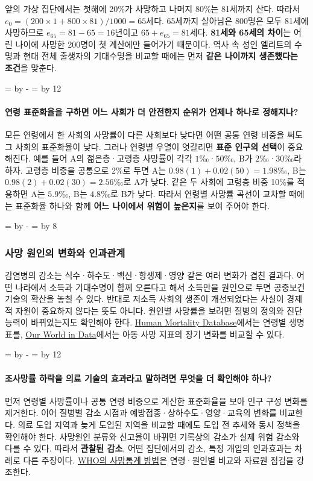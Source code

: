 \documentclass[10pt,a4paper]{article}
\newcommand{\ReserveQuestionSpace}{%
  \par\begingroup
  \dimen0=\pagegoal \advance\dimen0 by -\pagetotal
  \dimen2=\baselineskip \multiply\dimen2 by 12
  \ifdim\dimen0<\dimen2 \newpage\fi
  \endgroup}
\newcommand{\ReserveReadingSectionSpace}{%
  \par\begingroup
  \dimen0=\pagegoal \advance\dimen0 by -\pagetotal
  \dimen2=\baselineskip \multiply\dimen2 by 8
  \ifdim\dimen0<\dimen2 \newpage\fi
  \endgroup}
\begin{document}
앞의 가상 집단에서는 첫해에 20\%가 사망하고 나머지 80\%는 81세까지 산다. 따라서 $e_0=(200\times1+800\times81)/1000=65$세다. 65세까지 살아남은 800명은 모두 81세에 사망하므로 $e_{65}=81-65=16$년이고 $65+e_{65}=81$세다. \textbf{81세와 65세의 차이}는 어린 나이에 사망한 200명이 첫 계산에만 들어가기 때문이다. 역사 속 성인 엘리트의 수명과 현대 전체 출생자의 기대수명을 비교할 때에는 먼저 \textbf{같은 나이까지 생존했다는 조건}을 맞춘다.\par

\ReserveQuestionSpace
\paragraph{연령 표준화율을 구하면 어느 사회가 더 안전한지 순위가 언제나 하나로 정해지나?}
모든 연령에서 한 사회의 사망률이 다른 사회보다 낮다면 어떤 공통 연령 비중을 써도 그 사회의 표준화율이 낮다. 그러나 연령별 우열이 엇갈리면 \textbf{표준 인구의 선택}이 중요해진다. 예를 들어 A의 젊은층·고령층 사망률이 각각 $1$‰·$50$‰, B가 $2$‰·$30$‰라 하자. 고령층 비중을 공통으로 2\%로 두면 A는 $0.98(1)+0.02(50)=1.98$‰, B는 $0.98(2)+0.02(30)=2.56$‰로 A가 낮다. 같은 두 사회에 고령층 비중 10\%를 적용하면 A는 $5.9$‰, B는 $4.8$‰로 B가 낮다. 따라서 연령별 사망률 곡선이 교차할 때에는 표준화율 하나와 함께 \textbf{어느 나이에서 위험이 높은지}를 보여 주어야 한다.\par

\ReserveReadingSectionSpace
\subsubsection*{사망 원인의 변화와 인과관계}

감염병의 감소는 식수·하수도·백신·항생제·영양 같은 여러 변화가 겹친 결과다. 어떤 나라에서 소득과 기대수명이 함께 오른다고 해서 소득만을 원인으로 두면 공중보건 기술의 확산을 놓칠 수 있다. 반대로 저소득 사회의 생존이 개선되었다는 사실이 경제적 자원이 중요하지 않다는 뜻도 아니다. 원인별 사망률을 보려면 질병의 정의와 진단 능력이 바뀌었는지도 확인해야 한다. \href{https://www.mortality.org/}{Human Mortality Database}에서는 연령별 생명표를, \href{https://ourworldindata.org/child-mortality-global-overview}{Our World in Data}에서는 아동 사망 지표의 장기 변화를 비교할 수 있다.\par

\ReserveQuestionSpace
\paragraph{조사망률 하락을 의료 기술의 효과라고 말하려면 무엇을 더 확인해야 하나?}
먼저 연령별 사망률이나 공통 연령 비중으로 계산한 표준화율을 보아 인구 구성 변화를 제거한다. 이어 질병별 감소 시점과 예방접종·상하수도·영양·교육의 변화를 비교한다. 의료 도입 지역과 늦게 도입된 지역을 비교할 때에도 도입 전 추세와 동시 정책을 확인해야 한다. 사망원인 분류와 신고율이 바뀌면 기록상의 감소가 실제 위험 감소와 다를 수 있다. 따라서 \textbf{관찰된 감소}, 어떤 집단에서의 감소, 특정 개입의 인과효과는 차례로 다른 주장이다. \href{https://www.who.int/data/global-health-estimates/}{WHO의 사망통계 방법}은 연령·원인별 비교와 자료원 점검을 강조한다.\par
\end{document}

